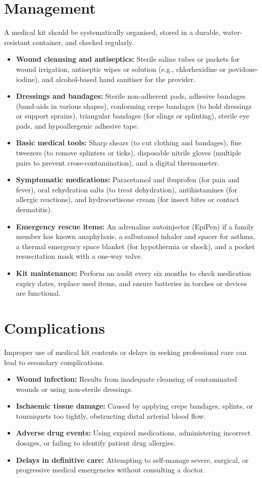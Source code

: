 \section*{Management}
A medical kit should be systematically organised, stored in a durable, water-resistant container, and checked regularly.
\begin{itemize}
    \item \textbf{Wound cleansing and antiseptics:} Sterile saline tubes or packets for wound irrigation, antiseptic wipes or solution (e.g., chlorhexidine or povidone-iodine), and alcohol-based hand sanitiser for the provider.
    \item \textbf{Dressings and bandages:} Sterile non-adherent pads, adhesive bandages (band-aids in various shapes), conforming crepe bandages (to hold dressings or support sprains), triangular bandages (for slings or splinting), sterile eye pads, and hypoallergenic adhesive tape.
    \item \textbf{Basic medical tools:} Sharp shears (to cut clothing and bandages), fine tweezers (to remove splinters or ticks), disposable nitrile gloves (multiple pairs to prevent cross-contamination), and a digital thermometer.
    \item \textbf{Symptomatic medications:} Paracetamol and ibuprofen (for pain and fever), oral rehydration salts (to treat dehydration), antihistamines (for allergic reactions), and hydrocortisone cream (for insect bites or contact dermatitis).
    \item \textbf{Emergency rescue items:} An adrenaline autoinjector (EpiPen) if a family member has known anaphylaxis, a salbutamol inhaler and spacer for asthma, a thermal emergency space blanket (for hypothermia or shock), and a pocket resuscitation mask with a one-way valve.
    \item \textbf{Kit maintenance:} Perform an audit every six months to check medication expiry dates, replace used items, and ensure batteries in torches or devices are functional.
\end{itemize}

\section*{Complications}
Improper use of medical kit contents or delays in seeking professional care can lead to secondary complications.
\begin{itemize}
    \item \textbf{Wound infection:} Results from inadequate cleansing of contaminated wounds or using non-sterile dressings.
    \item \textbf{Ischaemic tissue damage:} Caused by applying crepe bandages, splints, or tourniquets too tightly, obstructing distal arterial blood flow.
    \item \textbf{Adverse drug events:} Using expired medications, administering incorrect dosages, or failing to identify patient drug allergies.
    \item \textbf{Delays in definitive care:} Attempting to self-manage severe, surgical, or progressive medical emergencies without consulting a doctor.
\end{itemize}

